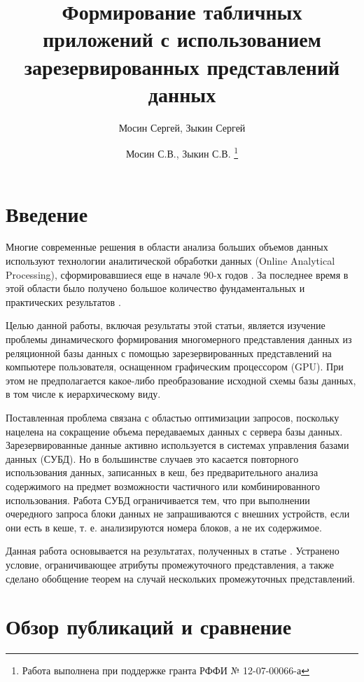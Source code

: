 \documentclass[10pt,a4paper]{article}
\author{Мосин Сергей, Зыкин Сергей}
\title{Формирование табличных приложений с использованием зарезервированных
представлений данных}
\author{
Мосин С.В., Зыкин С.В. \footnote{Работа выполнена при поддержке гранта РФФИ №
12-07-00066-а}
}
\date{}
\begin{document}
\maketitle

\section{Введение}

Многие современные решения в области анализа больших объемов данных
используют технологии аналитической обработки данных (Online Analytical
Processing), сформировавшиеся еще в начале 90-х годов \cite{codd}. За последнее
время в этой области было получено большое количество фундаментальных
\cite{lecht,lehner,mazon} и практических результатов \cite{vassi, peder,
progressive, giorg}.

Целью данной работы, включая результаты этой статьи, является изучение
проблемы динамического формирования
многомерного представления данных из реляционной базы данных с
помощью зарезервированных представлений на компьютере пользователя, оснащенном
графическим процессором (GPU). При этом не предполагается какое-либо
преобразование исходной схемы базы данных, в том числе к иерархическому виду.

Поставленная проблема связана с областью оптимизации
запросов, поскольку нацелена на сокращение объема передаваемых данных с сервера
базы данных. Зарезервированные данные активно используется в системах управления
базами данных (СУБД). Но в большинстве случаев это касается повторного
использования данных, записанных в кеш, без предварительного анализа
содержимого на предмет возможности частичного или комбинированного
использования. Работа СУБД ограничивается тем, что при выполнении очередного
запроса блоки данных не запрашиваются с внешних устройств, если они есть в
кеше, т. е. анализируются номера блоков, а не их содержимое.

Данная работа основывается на результатах, полученных в
статье \cite{zyk_pol}. Устранено условие, ограничивающее атрибуты промежуточного
представления, а также сделано обобщение теорем на случай нескольких
промежуточных представлений.

\section{Обзор публикаций и сравнение}
\end{document}
